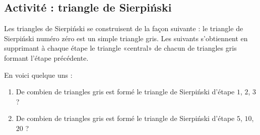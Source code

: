 
\subsection*{Activité : triangle de Sierpiński}

Les triangles de Sierpiński se construisent de la façon suivante : le triangle de Sierpiński numéro zéro est un simple triangle gris. Les suivants s'obtiennent en supprimant à chaque étape le triangle «central» de chacun de triangles gris formant l'étape précédente.

En voici quelque uns :



\begin{enumerate}
    \item
        De combien de triangles gris est formé le triangle de Sierpiński d'étape \( 1\), \( 2\), \( 3\) ?
    \item
        De combien de triangles gris est formé le triangle de Sierpiński d'étape \( 5\), \( 10\), \( 20\) ?
\end{enumerate}
